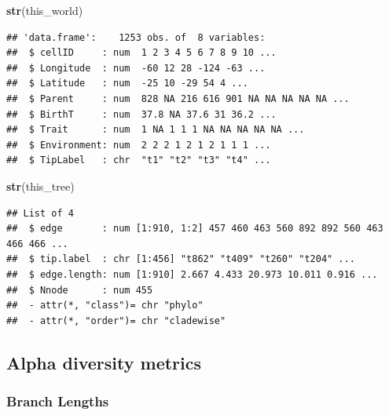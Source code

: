 \documentclass[]{book}
\newenvironment{Shaded}{\begin{snugshade}}{\end{snugshade}}
\newcommand{\KeywordTok}[1]{\textcolor[rgb]{0.13,0.29,0.53}{\textbf{{#1}}}}
\newcommand{\StringTok}[1]{\textcolor[rgb]{0.31,0.60,0.02}{{#1}}}
\newcommand{\OperatorTok}[1]{\textcolor[rgb]{0.81,0.36,0.00}{\textbf{{#1}}}}
\newcommand{\NormalTok}[1]{{#1}}
\theoremstyle{definition}
\theoremstyle{definition}
\theoremstyle{remark}
\begin{document}
\begin{Shaded}
\end{Shaded}

\begin{Shaded}
\begin{Highlighting}[]
\KeywordTok{str}\NormalTok{(this_world)}
\end{Highlighting}
\end{Shaded}

\begin{verbatim}
## 'data.frame':    1253 obs. of  8 variables:
##  $ cellID     : num  1 2 3 4 5 6 7 8 9 10 ...
##  $ Longitude  : num  -60 12 28 -124 -63 ...
##  $ Latitude   : num  -25 10 -29 54 4 ...
##  $ Parent     : num  828 NA 216 616 901 NA NA NA NA NA ...
##  $ BirthT     : num  37.8 NA 37.6 31 36.2 ...
##  $ Trait      : num  1 NA 1 1 1 NA NA NA NA NA ...
##  $ Environment: num  2 2 2 1 2 1 2 1 1 1 ...
##  $ TipLabel   : chr  "t1" "t2" "t3" "t4" ...
\end{verbatim}

\begin{Shaded}
\begin{Highlighting}[]
\KeywordTok{str}\NormalTok{(this_tree)}
\end{Highlighting}
\end{Shaded}

\begin{verbatim}
## List of 4
##  $ edge       : num [1:910, 1:2] 457 460 463 560 892 892 560 463 466 466 ...
##  $ tip.label  : chr [1:456] "t862" "t409" "t260" "t204" ...
##  $ edge.length: num [1:910] 2.667 4.433 20.973 10.011 0.916 ...
##  $ Nnode      : num 455
##  - attr(*, "class")= chr "phylo"
##  - attr(*, "order")= chr "cladewise"
\end{verbatim}

\hypertarget{alpha-diversity-metrics}{\subsection{Alpha diversity
metrics}\label{alpha-diversity-metrics}}

\hypertarget{branch-lengths}{\subsubsection{Branch
Lengths}\label{branch-lengths}}
\end{document}
